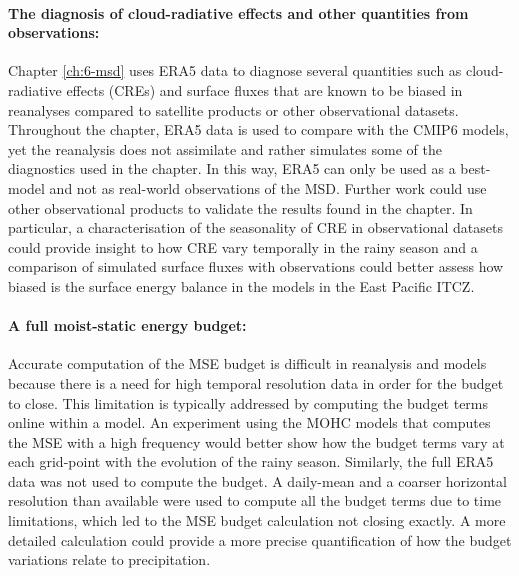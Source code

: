 \paragraph{The diagnosis of cloud-radiative effects and other quantities from observations:}
Chapter \ref{ch:6-msd} uses ERA5 data to diagnose several quantities such as cloud-radiative effects (CREs) and surface fluxes that are known to be biased in reanalyses compared to satellite products or other observational datasets.
Throughout the chapter, ERA5 data is used to compare with the CMIP6 models, yet the reanalysis does not assimilate and rather simulates some of the diagnostics used in the chapter.
In this way, ERA5 can only be used as a best-model and not as real-world observations of the MSD.
Further work could use other observational products to validate the results found in the chapter. 
In particular, a characterisation of the seasonality of CRE in observational datasets could provide insight to how CRE vary temporally in the rainy season and a comparison of simulated surface fluxes with observations could better assess how biased is the surface energy balance in the models in the East Pacific ITCZ.  

\paragraph{A full moist-static energy budget:}
Accurate computation of the MSE budget is difficult in reanalysis and models because there is a need for high temporal resolution data in order for the budget to close. 
This limitation is typically addressed by computing the budget terms online within a model. 
An experiment using the MOHC models that computes the MSE with a high frequency would better show how the budget terms vary at each grid-point with the evolution of the rainy season. 
Similarly, the full ERA5 data was not used to compute the budget. A daily-mean and a coarser horizontal resolution than available were used to compute all the budget terms due to time limitations, which led to the MSE budget calculation not closing exactly. 
A more detailed calculation could provide a more precise quantification of how the budget variations relate to precipitation. 

